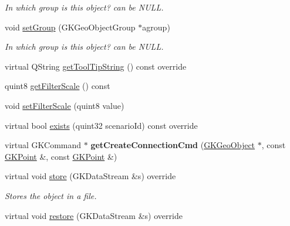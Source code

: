 \begin{DoxyCompactItemize}
\begin{DoxyCompactList}\small\item\em In which group is this object? can be N\+U\+LL. \end{DoxyCompactList}\item 
void \hyperlink{classGKGeoObject_aac42df6f761987deee79046d3ba53ff6}{set\+Group} (G\+K\+Geo\+Object\+Group $\ast$agroup)\hypertarget{classGKGeoObject_aac42df6f761987deee79046d3ba53ff6}{}\label{classGKGeoObject_aac42df6f761987deee79046d3ba53ff6}

\begin{DoxyCompactList}\small\item\em In which group is this object? can be N\+U\+LL. \end{DoxyCompactList}\item 
virtual Q\+String \hyperlink{classGKGeoObject_a72a947de242b8108e434881ec8046d62}{get\+Tool\+Tip\+String} () const override
\item 
quint8 \hyperlink{classGKGeoObject_a0308e2b5627e7a5f84dbb663b2769c27}{get\+Filter\+Scale} () const 
\item 
void \hyperlink{classGKGeoObject_ab57cdf6bc945e4d0c30582aa23b0a9a2}{set\+Filter\+Scale} (quint8 value)
\item 
virtual bool \hyperlink{classGKGeoObject_a7cfe423fb52cb46d8aa0bb148a4961e2}{exists} (quint32 scenario\+Id) const override
\item 
virtual G\+K\+Command $\ast$ {\bfseries get\+Create\+Connection\+Cmd} (\hyperlink{classGKGeoObject}{G\+K\+Geo\+Object} $\ast$, const \hyperlink{classGKPoint}{G\+K\+Point} \&, const \hyperlink{classGKPoint}{G\+K\+Point} \&)\hypertarget{classGKGeoObject_a7eaebdae37f0de7bd23ff5bdc211519b}{}\label{classGKGeoObject_a7eaebdae37f0de7bd23ff5bdc211519b}

\item 
virtual void \hyperlink{classGKGeoObject_ae44304ff62c691c3d78de0b5f0909e9d}{store} (G\+K\+Data\+Stream \&s) override\hypertarget{classGKGeoObject_ae44304ff62c691c3d78de0b5f0909e9d}{}\label{classGKGeoObject_ae44304ff62c691c3d78de0b5f0909e9d}

\begin{DoxyCompactList}\small\item\em Stores the object in a file. \end{DoxyCompactList}\item 
virtual void \hyperlink{classGKGeoObject_a25db05c75c600113d18a323e95db488a}{restore} (G\+K\+Data\+Stream \&s) override\hypertarget{classGKGeoObject_a25db05c75c600113d18a323e95db488a}{}\label{classGKGeoObject_a25db05c75c600113d18a323e95db488a}


\end{DoxyCompactItemize}
